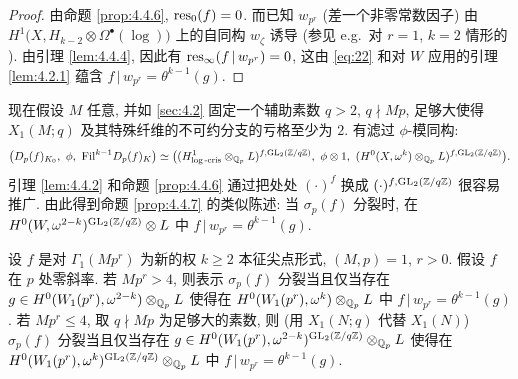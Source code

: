 \begin{proof}
由命题 \ref{prop:4.4.6}, $\operatorname{res}_0(f) = 0$.
而已知 $w_{p^{r}}$ (差一个非零常数因子) 由 $H^{1}\bigl(X,H_{k-2} \otimes \Omega^{\bullet}(\log)\bigr)$ 上的自同构 $w_{\zeta}$ 诱导 (参见 e.g.\ 对 $r = 1$, $k = 2$ 情形的 \cite[\S6]{ref:33}).
由引理 \ref{lem:4.4.4}, 因此有 $\operatorname{res}_{\infty}(f\,|\,w_{p^{r}}) = 0$, 这由 \eqref{eq:22} 和对 $W$ 应用的引理 \ref{lem:4.2.1} 蕴含 $f\,|\,w_{p^{r}} = \theta^{k-1}(g)$.
\end{proof}

现在假设 $M$ 任意, 并如 \ref{sec:4.2} 固定一个辅助素数 $q > 2$, $q \nmid Mp$, 足够大使得 $X_1(M;q)$ 及其特殊纤维的不可约分支的亏格至少为 $2$.
有滤过 $\phi$-模同构:
\[
\bigl(D_p(f)_{K_0},\ \phi,\ \mathrm{Fil}^{k-1}D_p(f)_K\bigr)
\simeq \bigl((H^{1}_{\log\text{-}\mathrm{cris}} \otimes_{\Qp} L)^{f,\GL_2(\mathbb{Z}/q\mathbb{Z})},\ \phi \otimes 1,\ (H^{0}(X,\omega^{k}) \otimes_{\Qp} L)^{f,\GL_2(\mathbb{Z}/q\mathbb{Z})}\bigr).
\]
引理 \ref{lem:4.4.2} 和命题 \ref{prop:4.4.6} 通过把处处 $(\cdot)^{f}$ 换成 $(\cdot)^{f,\mathrm{GL}_2(\mathbb{Z}/q\mathbb{Z})}$ 很容易推广.
由此得到命题 \ref{prop:4.4.7} 的类似陈述: 当 $\sigma_p(f)$ 分裂时, 在 $H^{0}(W,\omega^{2-k})^{\mathrm{GL}_2(\mathbb{Z}/q\mathbb{Z})} \otimes L$ 中 $f\,|\,w_{p^{r}} = \theta^{k-1}(g)$.

\begin{theorem}\label{thm:4.4.8}
设 $f$ 是对 $\Gamma_1(Mp^{r})$ 为新的权 $k \ge 2$ 本征尖点形式, $(M,p) = 1$, $r > 0$.
假设 $f$ 在 $p$ 处零斜率.
若 $Mp^{r} > 4$, 则表示 $\sigma_p(f)$ 分裂当且仅当存在 $g \in H^{0}(W_1(p^{r}),\omega^{2-k}) \otimes_{\mathbb{Q}_p} L$ 使得在 $H^{0}(W_1(p^{r}),\omega^{k}) \otimes_{\mathbb{Q}_p} L$ 中 $f\,|\,w_{p^{r}} = \theta^{k-1}(g)$.
若 $Mp^{r} \le 4$, 取 $q \nmid Mp$ 为足够大的素数, 则 (用 $X_1(N;q)$ 代替 $X_1(N)$) $\sigma_p(f)$ 分裂当且仅当存在 $g \in H^{0}(W_1(p^{r}),\omega^{2-k})^{\mathrm{GL}_2(\mathbb{Z}/q\mathbb{Z})} \otimes_{\mathbb{Q}_p} L$ 使得在 $H^{0}(W_1(p^{r}),\omega^{k})^{\mathrm{GL}_2(\mathbb{Z}/q\mathbb{Z})} \otimes_{\mathbb{Q}_p} L$ 中 $f\,|\,w_{p^{r}} = \theta^{k-1}(g)$.
\end{theorem}

